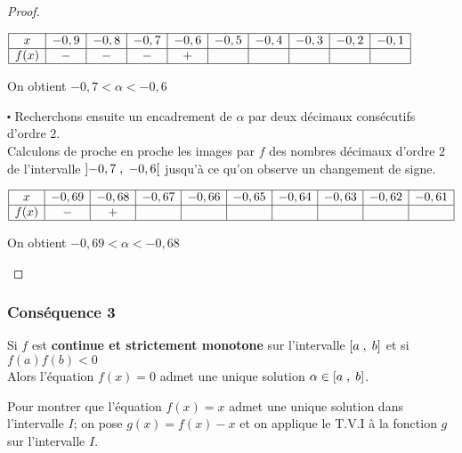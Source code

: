 \begin{proof}
\begin{enumerate}
\renewcommand{\arraystretch}{1}
$\begin{array}{|c|c|c|c|c|c|c|c|c|c|}
\hline 
x &-0,9  &-0,8 & -0,7 &- 0,6 & -0,5 & -0,4 &-0,3 &-0,2& -0,1  \\
\hline
f(x) &-  & -  &  - &  +  &  &  &  &  &  \\
\hline
\end{array}$

\vspace{0.5cm}   On obtient $-0,7<\alpha< - 0,6  $


$ \centerdot $ Recherchons ensuite  un encadrement de $ \alpha $ par deux décimaux consécutifs d'ordre $ 2. $\\
Calculons de proche en proche les images par $ f $  des nombres décimaux d'ordre $ 2 $ de l'intervalle $ \left]-0,7 \;,\; -0,6\right[ $ jusqu'à ce qu'on observe un changement de signe.

\begin{center}
$\begin{array}{|c|c|c|c|c|c|c|c|c|c|}
\hline 
x &-0,69  &-0,68 & -0,67 &- 0,66 & -0,65 & -0,64 &-0,63 &-0,62& -0,61  \\
\hline
f(x) & - &  +  &  &   &  &  &  &  &  \\
\hline
\end{array}$

\vspace{0.5cm}   On obtient $-0,69<\alpha< - 0,68  $

\end{center}
\end{enumerate}
  \end{proof}
  \subsubsection*{Conséquence 3}
  
 Si $ f $ est \textbf{\color{magenta}continue et strictement monotone} sur  l'intervalle $ \left[a\;,\; b\right] $ et si \colorbox{green!20!}{$ f(a)f(b) < 0 $ }\\
Alors l'équation $ f(x)=0 $ admet une  unique  solution $ \alpha \in \left[a\;,\; b\right] $.

\begin{remark}
Pour montrer que l'équation $ f(x)=x $ admet une  unique  solution dans l'intervalle $I$; on pose $ g(x)=f(x)-x $ et on applique le T.V.I à la fonction $ g $ sur l'intervalle $I$.
\end{remark}

